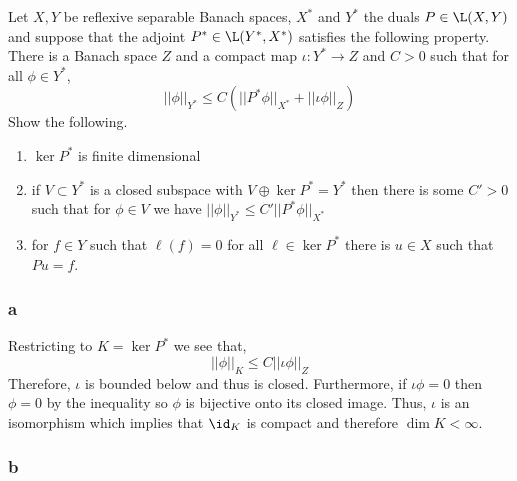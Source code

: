 \documentclass[12pt]{article}
\begin{document}
\begin{exercise}

Let $X, Y$ be reflexive separable Banach spaces, $X^*$ and $Y^*$ the duals $P \in \L(X, Y)$ and suppose that the adjoint $P^* \in \L(Y^*, X^*)$ satisfies the following property. There is a Banach space $Z$ and a compact map $\iota : Y^* \to Z$ and $C > 0$ such that for all $\phi \in Y^*$,
\[ || \phi ||_{Y^*} \le C (|| P^* \phi ||_{X^*} +  || \iota \phi ||_Z ) \]
Show the following.
\begin{enumerate}
\item $\ker{P^*}$ is finite dimensional
\item if $V \subset Y^*$ is a closed subspace with $V \oplus \ker{P^*} = Y^*$ then there is some $C' > 0$ such that for $\phi \in V$ we have $|| \phi ||_{Y^*} \le C' || P^* \phi ||_{X^*}$ 
\item for $f \in Y$ such that $\ell(f) = 0$ for all $\ell \in \ker{P^*}$ there is $u \in X$ such that $P u = f$.
\end{enumerate}
\end{exercise}

\subsubsection{a}

Restricting to $K = \ker{P^*}$ we see that,
\[ || \phi ||_{K} \le C || \iota \phi ||_Z \]
Therefore, $\iota$ is bounded below and thus is closed. Furthermore, if $\iota \phi = 0$ then $\phi = 0$ by the inequality so $\phi$ is bijective onto its closed image. Thus, $\iota$ is an isomorphism which implies that $\id_K$ is compact and therefore $\dim{K} < \infty$.

\subsubsection{b}
\end{document}
